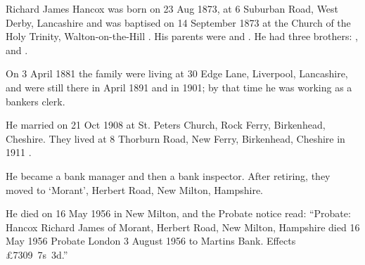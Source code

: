 
Richard James Hancox was born on 23 Aug 1873, at 6 Suburban Road, West Derby, Lancashire \cite{RJHancoxBirth} and was baptised on 14 September 1873 at the Church of the Holy Trinity, Walton-on-the-Hill \cite{RJHancoxBaptism}.  His parents were  and  . He had three brothers:
,  and .

On 3 April 1881 the family were living at 30 Edge Lane, Liverpool, Lancashire, \cite{RJHancoxResidence1} and were still there in April 1891 \cite{RJHancoxResidence2} and in 1901; by that time he was working as a bankers clerk.\cite{RJHancoxOccupation}

He married  on 21 Oct 1908 at St. Peters Church,  Rock Ferry, Birkenhead, Cheshire.\cite{RJHancoxMarriage} They lived at 8 Thorburn Road, New Ferry, Birkenhead, Cheshire in 1911 \cite{RJHancoxResidence3}.

He became a bank manager and then a bank inspector.  After retiring, they moved to `Morant', Herbert Road, New Milton, Hampshire.\cite{RJHancoxResidence4}

He died on 16 May 1956 in New Milton,  and the Probate notice read:
``Probate: Hancox Richard James of Morant, Herbert Road, New Milton, Hampshire died 16 May 1956 Probate London 3 August 1956 to Martins Bank. Effects \pounds7309~7s~3d.''\cite{RJHancoxDeath}
